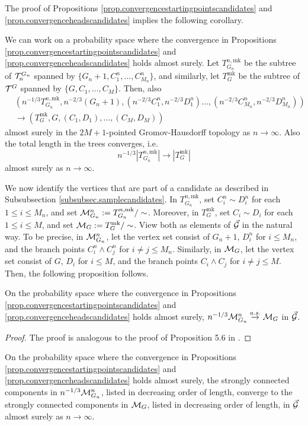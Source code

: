 The proof of Propositions \ref{prop.convergencestartingpointscandidates} and \ref{prop.convergenceheadscandidates} implies the following corollary.
\begin{corollary}
We can work on a probability space where the convergence in Propositions \ref{prop.convergencestartingpointscandidates} and \ref{prop.convergenceheadscandidates} holds almost surely. Let $T^{n,\text{mk}}_{G_n}$ be the subtree of ${\mathcal T}^{G_n}_n$ spanned by $\{G_n+1,C^n_1,\dots,C^n_{M_n}\}$, and similarly, let $T^{\text{mk}}_G$ be the subtree of ${\mathcal T}^{G}$ spanned by $\{G,C_1,\dots,C_M\}$. Then, also 
\begin{align*}&\left(n^{-1/3}T^{n,\text{mk}}_{G_n}, n^{-2/3}(G_n+1), \left(n^{-2/3}C^n_1,n^{-2/3}D^n_1\right) \dots, \left(n^{-2/3}C^n_{M_n}, n^{-2/3}D^n_{M_n}\right)\right)\\
&\to \left(T^{\text{mk}}_G, G, (C_1,D_1),\dots, (C_{M},D_{M})\right)\end{align*}
almost surely in the $2M+1$-pointed Gromov-Hausdorff topology as $n\to \infty$. Also the total length in the trees converges, i.e.
$$n^{-1/3}\left|T^{n,\text{mk}}_{G_n}\right|\to \left| T^{\text{mk}}_G\right|$$
almost surely as $n\to\infty$.
\end{corollary}
We now identify the vertices that are part of a candidate as described in Subsubsection \ref{subsubsec.samplecandidates}. In $T^{n,\text{mk}}_{G_n}$, set $C_i^n\sim D_i^n$ for each $1\leq i\leq M_n$, and set ${\mathcal M}^n_{G_n}:=T^{n,\text{mk}}_{G_n}/\sim$. Moreover, in $T^{\text{mk}}_{G}$, set $C_i\sim D_i$ for each $1\leq i\leq M$, and set ${\mathcal M}_{G}:=T^{\text{mk}}_{G}/\sim$. View both as elements of $\vec{{\mathcal G}}$ in the natural way. To be precise, in  ${\mathcal M}^n_{G_n}$, let the vertex set consist of $G_n+1$, $D_i^n$ for $i\leq M_n$, and the branch points $C_i^n\wedge C_j^n$ for $i\neq j\leq M_n$. Similarly, in ${\mathcal M}_{G}$, let the vertex set consist of $G$, $D_i$ for $i\leq M$, and the branch points $C_i\wedge C_j$ for $i\neq j\leq M$. Then, the following proposition follows.
\begin{proposition}
On the probability space where the convergence in Propositions \ref{prop.convergencestartingpointscandidates} and \ref{prop.convergenceheadscandidates} holds almost surely, 
$n^{-1/3}{\mathcal M}^n_{G_n}\overset{a.s.}{\to} {\mathcal M}_{G}$
in $\vec{{\mathcal G}}$.
\end{proposition}
\begin{proof}
The proof is analogous to the proof of Proposition 5.6 in \cite{Goldschmidt2019}.
\end{proof}
\begin{corollary}\label{cor.sccsinonetreeconverge}
On the probability space where the convergence in Propositions \ref{prop.convergencestartingpointscandidates} and \ref{prop.convergenceheadscandidates} holds almost surely, the strongly connected components in $n^{-1/3}{\mathcal M}^n_{G_n}$, listed in decreasing order of length, converge to the strongly connected components in ${\mathcal M}_{G}$, listed in decreasing order of length, in $\vec{{\mathcal G}}$ almost surely as $n\to \infty$.
\end{corollary}
